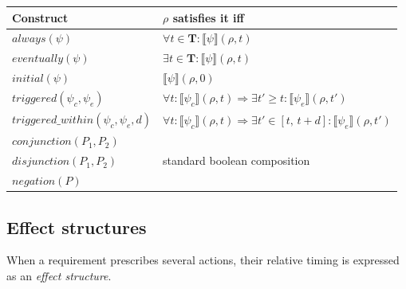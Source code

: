 \documentclass{article}
\begin{document}
\begin{tabularx}{\textwidth}{lX}
    \toprule
    \textbf{Construct}                              & \textbf{$\rho$ satisfies it iff}                                                                                          \\
    \midrule
    $\mathit{always}(\psi)$                         & $\forall t \in \mathbf{T}:\llbracket\psi\rrbracket(\rho,t)$                                                               \\
    $\mathit{eventually}(\psi)$                     & $\exists t \in \mathbf{T}:\llbracket\psi\rrbracket(\rho,t)$                                                               \\
    $\mathit{initial}(\psi)$                        & $\llbracket\psi\rrbracket(\rho,0)$                                                                                        \\
    $\mathit{triggered}(\psi_c, \psi_e)$            & $\forall t:\llbracket\psi_c\rrbracket(\rho,t) \Rightarrow \exists t' \geq t:\llbracket\psi_e\rrbracket(\rho,t')$          \\
    $\mathit{triggered\_within}(\psi_c, \psi_e, d)$ & $\forall t:\llbracket\psi_c\rrbracket(\rho,t) \Rightarrow \exists t' \in [t,\,t{+}d]:\llbracket\psi_e\rrbracket(\rho,t')$ \\
    $\mathit{conjunction}(P_1, P_2)$                & \multirow{3}{*}{standard boolean composition}                                                                             \\
    $\mathit{disjunction}(P_1, P_2)$                &                                                                                                                           \\
    $\mathit{negation}(P)$                          &                                                                                                                           \\
    \bottomrule
\end{tabularx}

\subsection{Effect structures}

When a requirement prescribes several actions, their relative timing is expressed as an \emph{effect structure}.
\end{document}
